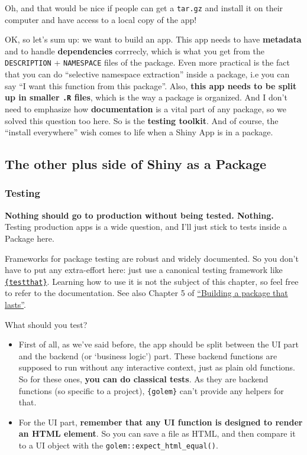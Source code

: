 \documentclass[]{book}
\begin{document}
Oh, and that would be nice if people can get a \texttt{tar.gz} and install it on their computer and have access to a local copy of the app!

OK, so let's sum up: we want to build an app. This app needs to have \textbf{metadata} and to handle \textbf{dependencies} corrrecly, which is what you get from the \texttt{DESCRIPTION} + \texttt{NAMESPACE} files of the package. Even more practical is the fact that you can do ``selective namespace extraction'' inside a package, i.e you can say ``I want this function from this package''. Also, \textbf{this app needs to be split up in smaller \texttt{.R} files}, which is the way a package is organized. And I don't need to emphasize how \textbf{documentation} is a vital part of any package, so we solved this question too here. So is the \textbf{testing toolkit}. And of course, the ``install everywhere'' wish comes to life when a Shiny App is in a package.

\hypertarget{the-other-plus-side-of-shiny-as-a-package}{%
\subsection{The other plus side of Shiny as a Package}\label{the-other-plus-side-of-shiny-as-a-package}}

\hypertarget{testing}{%
\subsubsection{Testing}\label{testing}}

\textbf{Nothing should go to production without being tested. Nothing.} Testing production apps is a wide question, and I'll just stick to tests inside a Package here.

Frameworks for package testing are robust and widely documented. So you don't have to put any extra-effort here: just use a canonical testing framework like \href{https://testthat.r-lib.org/}{\texttt{\{testthat\}}}. Learning how to use it is not the subject of this chapter, so feel free to refer to the documentation. See also Chapter 5 of \href{https://speakerdeck.com/colinfay/building-a-package-that-lasts-erum-2018-workshop?slide=107}{``Building a package that lasts''}.

What should you test?

\begin{itemize}
\item
  First of all, as we've said before, the app should be split between the UI part and the backend (or `business logic') part. These backend functions are supposed to run without any interactive context, just as plain old functions. So for these ones, \textbf{you can do classical tests}. As they are backend functions (so specific to a project), \texttt{\{golem\}} can't provide any helpers for that.
\item
  For the UI part, \textbf{remember that any UI function is designed to render an HTML element}. So you can save a file as HTML, and then compare it to a UI object with the \texttt{golem::expect\_html\_equal()}.
\end{itemize}
\end{document}
